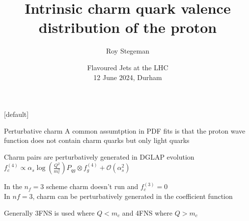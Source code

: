 \documentclass[aspectratio=43, 8pt,t]{beamer}
\title{Intrinsic charm quark valence distribution of the proton}
\date{Flavoured Jets at the LHC  \\[0.1cm] 12 June 2024, Durham}
\author{Roy Stegeman}
\institute{\small The University of Edinburgh}
\begin{document}
{
\begin{frame}
  \titlepage
\end{frame}
}

[default]



\newcommand{\nn}{\vspace*{1em}}






\begin{frame}{Perturbative charm}
  A common assumtption in PDF fits is that the proton wave function does not contain charm quarks but only light quarks

  \vspace*{1em}
  Charm pairs are perturbatively generated in DGLAP evolution\\
  $f_c^{(4)}\propto \alpha_s \log\left(\frac{Q^2}{m_c^2}\right)P_{qg} \otimes f_g^{(4)} + \mathcal{O}(\alpha_s^2)$

  \vspace*{1em}
  In the $n_f=3$ scheme charm doesn't run and $f_c^{(3)}=0$ \\
  In $nf=3$, charm can be perturbatively generated in the coefficient function

  \vspace*{1em}
  Generally 3FNS is used where $Q<m_c$ and 4FNS where $Q>m_c$


  \vspace*{1em}
\end{frame}
\end{document}
